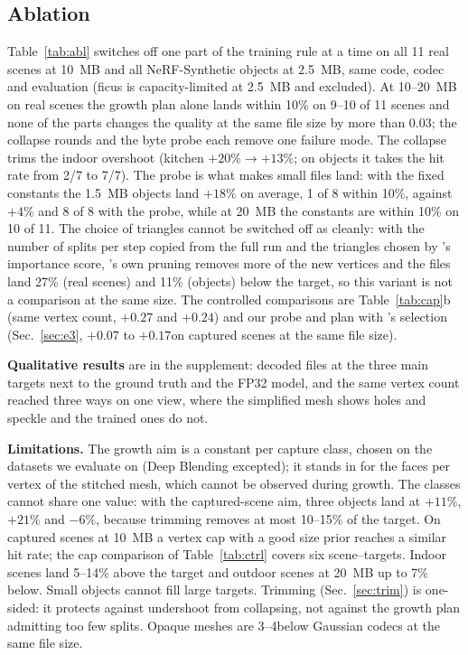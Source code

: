 \subsection{Ablation}
\label{sec:e7}
Table~\ref{tab:abl} switches off one part of the training rule at a time on all 11 real scenes at 10~MB and all NeRF-Synthetic objects at 2.5~MB, same code, codec and evaluation (ficus is capacity-limited at 2.5~MB and excluded). At 10--20~MB on real scenes the growth plan alone lands within 10\% on 9--10 of 11 scenes and none of the parts changes the quality at the same file size by more than 0.03\dB; the collapse rounds and the byte probe each remove one failure mode. The collapse trims the indoor overshoot (kitchen $+20\%\rightarrow+13\%$; on objects it takes the hit rate from 2/7 to 7/7). The probe is what makes small files land: with the fixed constants the 1.5~MB objects land $+18\%$ on average, 1 of 8 within 10\%, against $+4\%$ and 8 of 8 with the probe, while at 20~MB the constants are within 10\% on 10 of 11. The choice of triangles cannot be switched off as cleanly: with the number of splits per step copied from the full run and the triangles chosen by \MS's importance score, \MS's own pruning removes more of the new vertices and the files land 27\% (real scenes) and 11\% (objects) below the target, so this variant is not a comparison at the same size. The controlled comparisons are Table~\ref{tab:cap}b (same vertex count, $+0.27$ and $+0.24$\dB) and our probe and plan with \MS's selection (Sec.~\ref{sec:e3}, $+0.07$ to $+0.17$\dB on captured scenes at the same file size).

\noindent\textbf{Qualitative results} are in the supplement: decoded files at the three main targets next to the ground truth and the FP32 model, and the same vertex count reached three ways on one view, where the simplified mesh shows holes and speckle and the trained ones do not.

\noindent\textbf{Limitations.} The growth aim is a constant per capture class, chosen on the datasets we evaluate on (Deep Blending excepted); it stands in for the faces per vertex of the stitched mesh, which cannot be observed during growth. The classes cannot share one value: with the captured-scene aim, three objects land at $+11\%$, $+21\%$ and $-6\%$, because trimming removes at most 10--15\% of the target. On captured scenes at 10~MB a vertex cap with a good size prior reaches a similar hit rate; the cap comparison of Table~\ref{tab:ctrl} covers six scene--targets. Indoor scenes land 5--14\% above the target and outdoor scenes at 20~MB up to 7\% below. Small objects cannot fill large targets. Trimming (Sec.~\ref{sec:trim}) is one-sided: it protects against undershoot from collapsing, not against the growth plan admitting too few splits. Opaque meshes are 3--4\dB below Gaussian codecs at the same file size.
